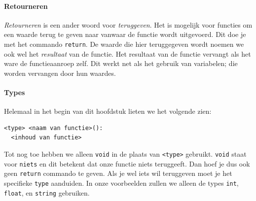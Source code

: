 \paragraph{Retourneren}

\emph{Retourneren} is een ander woord voor \emph{teruggeven}. Het is mogelijk voor functies om een waarde terug te geven naar vanwaar de functie wordt uitgevoerd. Dit doe je met het commando \texttt{return}. De waarde die hier teruggegeven wordt noemen we ook wel het \emph{resultaat} van de functie. Het resultaat van de functie vervangt als het ware de functieaanroep zelf. Dit werkt net als het gebruik van variabelen; die worden vervangen door hun waardes.

\paragraph{Types}
Helemaal in het begin van dit hoofdstuk lieten we het volgende zien:

\begin{verbatim}
<type> <naam van functie>():
  <inhoud van functie>
\end{verbatim}

Tot nog toe hebben we alleen \texttt{void} in de plaats van \texttt{<type>} gebruikt. \texttt{void} staat voor \texttt{niets} en dit betekent dat onze functie niets teruggeeft. Dan hoef je dus ook geen \texttt{return} commando te geven. Als je wel iets wil teruggeven moet je het specifieke \texttt{type} aanduiden. In onze voorbeelden zullen we alleen de types \texttt{int}, \texttt{float}, en \texttt{string} gebruiken.

